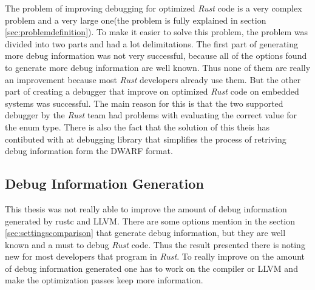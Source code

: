 

The problem of improving debugging for optimized \emph{Rust} code is a very complex problem and a very large one(the problem is fully explained in section \ref{sec:problemdefinition}).
To make it easier to solve this problem, the problem was divided into two parts and had a lot delimitations.
The first part of generating more debug information was not very successful, because all of the options found to generate more debug information are well known.
Thus none of them are really an improvement because most \emph{Rust} developers already use them.
But the other part of creating a debugger that improve on optimized \emph{Rust} code on embedded systems was successful.
The main reason for this is that the two supported debugger by the \emph{Rust} team had problems with evaluating the correct value for the enum type.
There is also the fact that the solution of this theis has contibuted with at debugging library that simplifies the process of retriving debug information form the \gls{DWARF} format.


\subsection{Debug Information Generation}
This thesis was not really able to improve the amount of debug information generated by \gls{rustc} and \gls{LLVM}.
There are some options mention in the section \ref{sec:settingscomparison} that generate debug information, but they are well known and a must to debug \emph{Rust} code.
Thus the result presented there is noting new for most developers that program in \emph{Rust}.
To really improve on the amount of debug information generated one has to work on the compiler or \gls{LLVM} and make the optimization passes keep more information.


